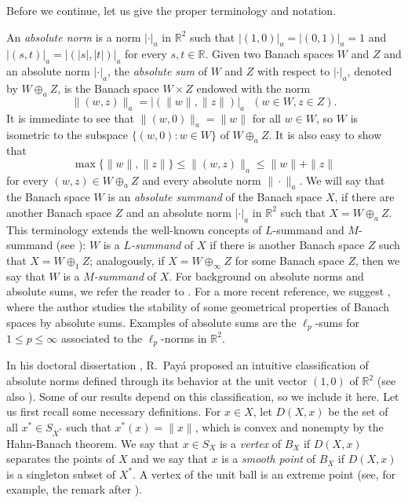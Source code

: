 \documentclass[10pt,a4paper]{amsart}
\theoremstyle{plain}
\theoremstyle{definition}
\newcommand{\R}{\mathbb{R}}
\renewcommand{\leq}{\leqslant}
\begin{document}
Before we continue, let us give the proper terminology and notation.

An {\it absolute norm} is a norm $| \cdot |_a$ in $\R^2$ such that $|(1, 0)|_a = |(0, 1)|_a = 1$ and $|(s, t)|_a = |(|s|, |t|)|_a$ for every $s, t \in \R$. Given two Banach spaces $W$ and $Z$ and an absolute norm $| \cdot |_a$, the {\it absolute sum} of $W$ and $Z$ with respect to $| \cdot |_a$, denoted by $W \oplus_a Z$, is the Banach space $W \times Z$ endowed with the norm
\begin{equation*}
\|(w, z)\|_a = |(\|w\|, \|z\|)|_a \ \ \ (w \in W, z \in Z).
\end{equation*}
It is immediate to see that $\|(w, 0)\|_a = \|w\|$ for all $w \in W$, so $W$ is isometric to the subspace $\{(w,0)\colon w\in W\}$ of $W \oplus_a Z$. It is also easy to show that
\begin{equation} \label{ine1}
\max\{\|w\|,\|z\|\} \leq \| (w,z) \|_a \leq \|w\|+\|z\|
\end{equation}
for every $(w,z)\in W\oplus_a Z$ and every absolute norm $\| \cdot \|_a$. We will say that the Banach space $W$ is an {\it absolute summand} of the Banach space $X$, if there are another Banach space $Z$ and an absolute norm $| \cdot |_a$ in $\R^2$ such that $X = W \oplus_a Z$.  This terminology extends the well-known concepts of $L$-summand and $M$-summand (see \cite{HWW}): $W$ is a {\it $L$-summand} of $X$ if there is another Banach space $Z$ such that $X = W \oplus_1 Z$; analogously, if $X = W \oplus_{\infty} Z$ for some Banach space $Z$, then we say that $W$ is a {\it $M$-summand} of $X$. For background on absolute norms and absolute sums, we refer the reader to \cite{Bonsall1,MPR1,MPR2, MPR3, Paya, Paya1}. For a more recent reference, we suggest \cite{Hardtke}, where the author studies the stability of some geometrical properties of Banach spaces by absolute sums. Examples of absolute sums are the $\ell_p$-sums for $1 \leq p \leq \infty$ associated to the $\ell_p$-norms in $\R^2$.

In his doctoral dissertation \cite{Paya}, R.~Pay\'a proposed an intuitive classification of absolute norms defined through its behavior at the unit vector $(1, 0)$ of $\R^2$ (see also \cite[p.~38]{MPR1}). Some of our results depend on this classification, so we include it here. Let us first recall some necessary definitions. For $x \in X$, let $D(X, x)$ be the set of all $x^* \in S_{X^*}$ such that $x^*(x) = \|x\|$, which is convex and nonempty by the Hahn-Banach theorem. We say that $x \in S_X$ is a {\it vertex} of $B_X$ if $D(X, x)$ separates the points of $X$ and we say that $x$ is a {\it smooth point} of $B_X$ if $D(X, x)$ is a singleton subset of $X^*$. A vertex of the unit ball is an extreme point (see, for example, the remark after \cite[Theorem 4.6]{Bonsall0}).
\end{document}
